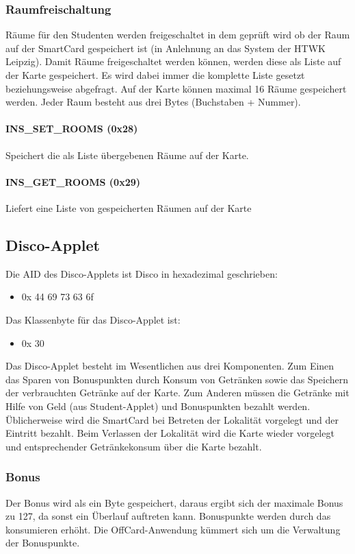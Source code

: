 \subsubsection{Raumfreischaltung}
Räume für den Studenten werden freigeschaltet in dem geprüft wird ob der Raum auf der SmartCard gespeichert ist (in Anlehnung an das System der HTWK Leipzig).
Damit Räume freigeschaltet werden können, werden diese als Liste auf der Karte gespeichert.
Es wird dabei immer die komplette Liste gesetzt beziehungsweise abgefragt.
Auf der Karte können maximal 16 Räume gespeichert werden.
Jeder Raum besteht aus drei Bytes (Buchstaben + Nummer).

\paragraph{INS\_SET\_ROOMS (0x28)}
Speichert die als Liste übergebenen Räume auf der Karte.
\paragraph{INS\_GET\_ROOMS (0x29)}
Liefert eine Liste von gespeicherten Räumen auf der Karte

\subsection{Disco-Applet}
Die AID des Disco-Applets ist Disco in hexadezimal geschrieben:
\begin{itemize}
	\item 0x 44 69 73 63 6f
\end{itemize}
Das Klassenbyte für das Disco-Applet ist:
\begin{itemize}
	\item 0x 30
\end{itemize}

Das Disco-Applet besteht im Wesentlichen aus drei Komponenten.
Zum Einen das Sparen von Bonuspunkten durch Konsum von Getränken sowie das Speichern der verbrauchten Getränke auf der Karte.
Zum Anderen müssen die Getränke mit Hilfe von Geld (aus Student-Applet) und Bonuspunkten bezahlt werden. 
Üblicherweise wird die SmartCard bei Betreten der Lokalität vorgelegt und der Eintritt bezahlt.
Beim Verlassen der Lokalität wird die Karte wieder vorgelegt und entsprechender Getränkekonsum über die Karte bezahlt.

\subsubsection{Bonus}
Der Bonus wird als ein Byte gespeichert, daraus ergibt sich der maximale Bonus zu 127, da sonst ein Überlauf auftreten kann.
Bonuspunkte werden durch das konsumieren erhöht.
Die OffCard-Anwendung kümmert sich um die Verwaltung der Bonuspunkte.

